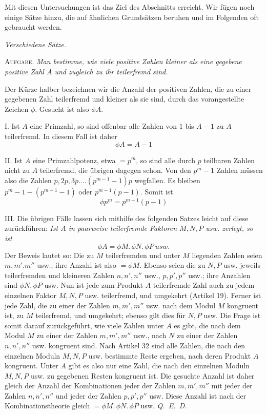Mit diesen Untersuchungen ist das Ziel des Abschnitts erreicht. Wir fügen noch einige Sätze hinzu, die auf ähnlichen Grundsätzen beruhen und im Folgenden oft gebraucht werden.

\begin{center}\emph{Verschiedene Sätze.}\end{center}

\textsc{Aufgabe.} \emph{Man bestimme, wie viele positive Zahlen kleiner als eine gegebene positive Zahl $A$ und zugleich zu ihr teilerfremd sind.}

Der Kürze halber bezeichnen wir die Anzahl der positiven Zahlen, die zu einer gegebenen Zahl teilerfremd und kleiner als sie sind, durch das vorangestellte Zeichen $\phi$. Gesucht ist also $\phi A$.

I. Ist $A$ eine Primzahl, so sind offenbar alle Zahlen von $1$ bis $A-1$ zu $A$ teilerfremd. In diesem Fall ist daher
\[\phi A=A-1\]

II. Ist $A$ eine Primzahlpotenz, etwa $=p^m$, so sind alle durch $p$ teilbaren Zahlen nicht zu $A$ teilerfremd, die übrigen dagegen schon. Von den $p^m-1$ Zahlen müssen also die Zahlen $p,2p,3p....(p^{m-1}-1)p$ wegfallen. Es bleiben $p^m-1-(p^{m-1}-1)$ oder $p^{m-1}(p-1)$. Somit ist
\[\phi p^m=p^{m-1}(p-1)\]

III. Die übrigen Fälle lassen sich mithilfe des folgenden Satzes leicht auf diese zurückführen: \emph{Ist $A$ in paarweise teilerfremde Faktoren $M,N,P$ usw. zerlegt, so ist}
\[\phi A=\phi M.\,\phi N.\,\phi P\ \textit{usw.}\]
Der Beweis lautet so: Die zu $M$ teilerfremden und unter $M$ liegenden Zahlen seien $m,m'.m''$ usw.; ihre Anzahl ist also $=\phi M$. Ebenso seien die zu $N,P$ usw. jeweils teilerfremden und kleineren Zahlen $n,n',n''$ usw., $p,p',p''$ usw.; ihre Anzahlen sind $\phi N,\phi P$ usw. Nun ist jede zum Produkt $A$ teilerfremde Zahl auch zu jedem einzelnen Faktor $M,N,P$ usw. teilerfremd, und umgekehrt (Artikel 19). Ferner ist jede Zahl, die zu einer der Zahlen $m,m',m''$ usw. nach dem Modul $M$ kongruent ist, zu $M$ teilerfremd, und umgekehrt; ebenso gilt dies für $N,P$ usw. Die Frage ist somit darauf zurückgeführt, wie viele Zahlen unter $A$ es gibt, die nach dem Modul $M$ zu einer der Zahlen $m,m',m''$ usw., nach $N$ zu einer der Zahlen $n,n',n''$
usw. kongruent sind. Nach Artikel 32 sind alle Zahlen, die nach den einzelnen Moduln $M,N,P$ usw. bestimmte Reste ergeben, nach deren Produkt $A$ kongruent. Unter $A$ gibt es also nur eine Zahl, die nach den einzelnen Moduln $M,N,P$ usw. zu gegebenen Resten kongruent ist. Die gesuchte Anzahl ist daher gleich der Anzahl der Kombinationen jeder der Zahlen $m,m',m''$ mit jeder der Zahlen $n,n',n''$ und jeder der Zahlen $p,p',p''$ usw. Diese Anzahl ist nach der Kombinationstheorie gleich $=\phi M.\,\phi N.\,\phi P$ usw. \mbox{\emph{Q. E. D.}}

